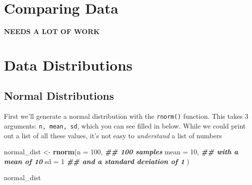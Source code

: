 \documentclass[
]{book}
\newenvironment{Shaded}{\begin{snugshade}}{\end{snugshade}}
\newcommand{\AttributeTok}[1]{\textcolor[rgb]{0.13,0.29,0.53}{#1}}
\newcommand{\DecValTok}[1]{\textcolor[rgb]{0.00,0.00,0.81}{#1}}
\newcommand{\DocumentationTok}[1]{\textcolor[rgb]{0.56,0.35,0.01}{\textbf{\textit{#1}}}}
\newcommand{\FunctionTok}[1]{\textcolor[rgb]{0.13,0.29,0.53}{\textbf{#1}}}
\newcommand{\NormalTok}[1]{#1}
\newcommand{\OtherTok}[1]{\textcolor[rgb]{0.56,0.35,0.01}{#1}}
\begin{document}
\hypertarget{comparing-data}{%
\section*{Comparing Data}\label{comparing-data}}

\textbf{NEEDS A LOT OF WORK}

\hypertarget{data-distributions}{%
\section*{Data Distributions}\label{data-distributions}}

\hypertarget{normal-distributions}{%
\subsection{Normal Distributions}\label{normal-distributions}}

First we'll generate a normal distribution with the \texttt{rnorm()} function. This takes 3 arguments: \texttt{n,\ mean,\ sd}, which you can see filled in below. While we could print out a list of all these values, it's not easy to \emph{understand} a list of numbers

\begin{Shaded}
\begin{Highlighting}[]
\NormalTok{normal\_dist }\OtherTok{\textless{}{-}} \FunctionTok{rnorm}\NormalTok{(}\AttributeTok{n =} \DecValTok{100}\NormalTok{, }\DocumentationTok{\#\# 100 samples}
                     \AttributeTok{mean =} \DecValTok{10}\NormalTok{, }\DocumentationTok{\#\# with a mean of 10}
                     \AttributeTok{sd =} \DecValTok{1} \DocumentationTok{\#\# and a standard deviation of 1}
\NormalTok{                     )}


\NormalTok{normal\_dist}
\end{Highlighting}
\end{Shaded}
\end{document}
